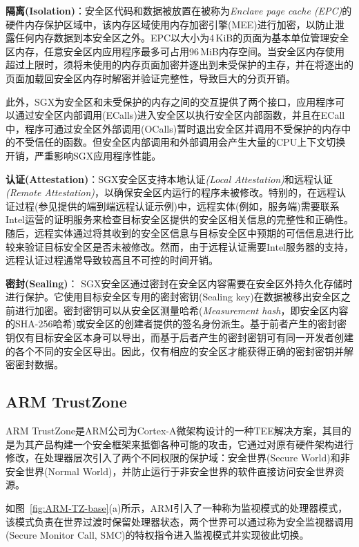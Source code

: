 \textbf{隔离(Isolation)}：安全区代码和数据被放置在被称为\textit{Enclave page cache (EPC)}的硬件内存保护区域中，该内存区域使用内存加密引擎(MEE)进行加密，以防止泄露任何内存数据到本安全区之外。EPC以大小为4\,KiB的页面为基本单位管理安全区内存，任意安全区内应用程序最多可占用96\,MiB内存空间\cite{harnik2018SGX}。当安全区内存使用超过上限时，须将未使用的内存页面加密并逐出到未受保护的主存，并在将逐出的页面加载回安全区内存时解密并验证完整性，导致巨大的分页开销\cite{arnautov2016SCONE,dinhngoc2019Everything}。

此外，SGX为安全区和未受保护的内存之间的交互提供了两个接口，应用程序可以通过安全区内部调用(ECalls)进入安全区以执行安全区内部函数，并且在ECall中，程序可通过安全区外部调用(OCalls)暂时退出安全区并调用不受保护的内存中的不受信任的函数。但安全区内部调用和外部调用会产生大量的CPU上下文切换开销\cite{harnik2018SGX}，严重影响SGX应用程序性能。

\textbf{认证(Attestation)}：SGX安全区支持本地认证\textit{(Local Attestation)}和远程认证\textit{(Remote Attestation)}，以确保安全区内运行的程序未被修改。特别的，在远程认证过程(参见\cite{SGX-RA}提供的端到端远程认证示例)中，远程实体(例如，服务端)需要联系Intel运营的证明服务来检查目标安全区提供的安全区相关信息的完整性和正确性。随后，远程实体通过将其收到的安全区信息与目标安全区中预期的可信信息进行比较来验证目标安全区是否未被修改。然而，由于远程认证需要Intel服务器的支持，远程认证过程通常导致较高且不可控的时间开销。

\textbf{密封(Sealing)}： SGX安全区通过密封在安全区内容需要在安全区外持久化存储时进行保护。它使用目标安全区专用的密封密钥(Sealing key)在数据被移出安全区之前进行加密。密封密钥可以从安全区测量哈希(\textit{Measurement hash}，即安全区内容的SHA-256哈希)或安全区的创建者提供的签名身份派生。基于前者产生的密封密钥仅有目标安全区本身可以导出，而基于后者产生的密封密钥可有同一开发者创建的各个不同的安全区导出。因此，仅有相应的安全区才能获得正确的密封密钥并解密密封数据。

\subsection{ARM TrustZone}
\label{subsec:background-tee-tz}

ARM TrustZone\cite{trustzone}是ARM公司为Cortex-A微架构\cite{cortex-a}设计的一种TEE解决方案，其目的是为其产品构建一个安全框架来抵御各种可能的攻击，它通过对原有硬件架构进行修改，在处理器层次引入了两个不同权限的保护域：安全世界(Secure World)和非安全世界(Normal World)，并防止运行于非安全世界的软件直接访问安全世界资源。

如图~\ref{fig:ARM-TZ-base}(a)所示，ARM引入了一种称为监视模式的处理器模式，该模式负责在世界过渡时保留处理器状态，两个世界可以通过称为安全监视器调用(Secure Monitor Call, SMC)的特权指令进入监视模式并实现彼此切换。

